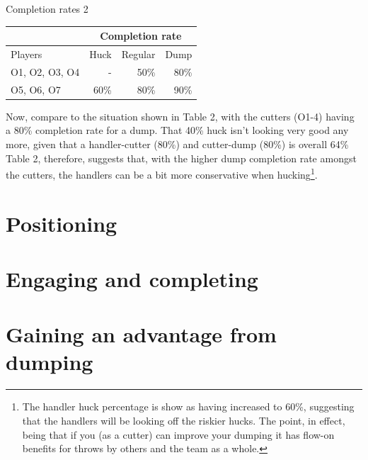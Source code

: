 \documentclass{tufte-handout}
\begin{document}
\begin{margintable}
\caption{Completion rates 2}
\begin{tabular}{|l|r r r|}
\hline
 & \multicolumn{3}{|c|}{Completion rate} \\
 \hline
Players & Huck & Regular & Dump \\
O1, O2, O3, O4 & - & 50\% & 80\% \\
O5, O6, O7 & 60\% & 80\% & 90\%\\
\hline
\end{tabular}
\end{margintable}

Now, compare to the 
situation shown in Table 2, 
with the cutters (O1-4) 
having a 80\% completion rate 
for a dump.
That 40\% huck isn't looking 
very good any more, 
given that a handler-cutter (80\%) 
and cutter-dump (80\%) is overall 
64\%
Table 2, therefore, 
suggests that, 
with the higher dump completion rate
amongst the cutters, 
the handlers can
be a bit more conservative 
when hucking\footnote{
The handler huck 
percentage is show 
as having increased 
to 60\%, 
suggesting that the handlers
will be looking off the 
riskier hucks. 
The point, 
in effect, 
being that 
if you (as a cutter) 
can improve 
your dumping 
it has flow-on benefits 
for throws by others 
and the team as a whole.}.






\section{Positioning}
\label{sec:positioning}

\section{Engaging and completing}
\label{sec:engaging}

\section{Gaining an advantage from dumping}
\label{sec:engaging}
\end{document}
